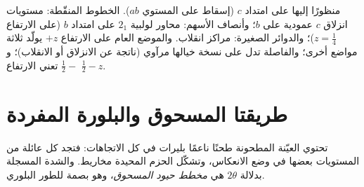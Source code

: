 \begin{omfigure}

{\small {}  منظورًا إليها على امتداد $c$ (إسقاط على المستوي $ab$).
الخطوط المنقّطة: مستويات انزلاق $c$ عمودية على $b$؛ وأنصاف الأسهم: محاور لولبية $2_1$
على امتداد $b$ (على الارتفاع $z = \frac14$)؛ والدوائر الصغيرة: مراكز انقلاب. والموضع
العام على الارتفاع $+z$ يولّد ثلاثة مواضع أخرى؛ والفاصلة تدل على نسخة
خيالها مرآوي (ناتجة عن الانزلاق أو الانقلاب)؛ و$\frac12{-}$ تعني الارتفاع $\frac12 - z$.}
\end{omfigure}

\section{طريقتا المسحوق والبلورة المفردة}

\begin{definition}\label{def:b3:x-ray-diffraction:powder}
تحتوي العيّنة المطحونة طحنًا ناعمًا بليرات في كل الاتجاهات: فتجد كل
عائلة من المستويات بعضها في وضع الانعكاس، وتشكّل الحزم المحيدة
مخاريط. والشدة المسجلة بدلالة $2\theta$ هي \emph{مخطط حيود
المسحوق}، وهو بصمة
للطور البلوري.
\end{definition}

